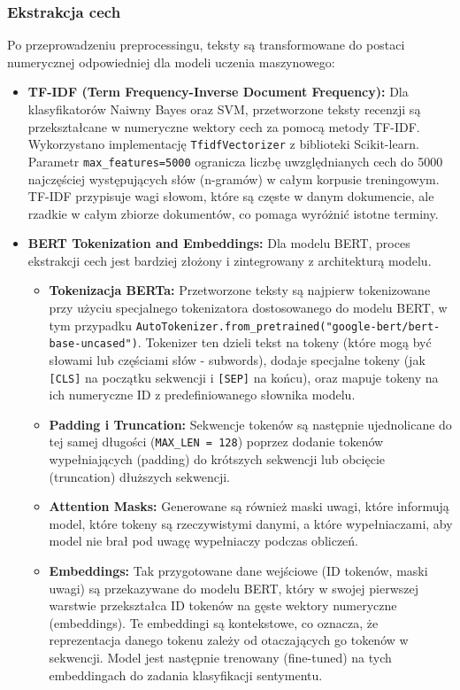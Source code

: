 \documentclass[runningheads]{llncs}
\begin{document}
\subsubsection{Ekstrakcja cech}
Po przeprowadzeniu preprocessingu, teksty są transformowane do postaci numerycznej odpowiedniej dla modeli uczenia maszynowego:
\begin{itemize}
    \item \textbf{TF-IDF (Term Frequency-Inverse Document Frequency):} Dla klasyfikatorów Naiwny Bayes oraz SVM, przetworzone teksty recenzji są przekształcane w numeryczne wektory cech za pomocą metody TF-IDF. Wykorzystano implementację \texttt{TfidfVectorizer} z biblioteki Scikit-learn. Parametr \texttt{max\_features=5000} ogranicza liczbę uwzględnianych cech do 5000 najczęściej występujących słów (n-gramów) w całym korpusie treningowym. TF-IDF przypisuje wagi słowom, które są częste w danym dokumencie, ale rzadkie w całym zbiorze dokumentów, co pomaga wyróżnić istotne terminy.
    \item \textbf{BERT Tokenization and Embeddings:} Dla modelu BERT, proces ekstrakcji cech jest bardziej złożony i zintegrowany z architekturą modelu.
    \begin{itemize}
        \item \textbf{Tokenizacja BERTa:} Przetworzone teksty są najpierw tokenizowane przy użyciu specjalnego tokenizatora dostosowanego do modelu BERT, w tym przypadku \texttt{AutoTokenizer.from\_pretrained("google-bert/bert-base-uncased")}. Tokenizer ten dzieli tekst na tokeny (które mogą być słowami lub częściami słów - subwords), dodaje specjalne tokeny (jak \texttt{[CLS]} na początku sekwencji i \texttt{[SEP]} na końcu), oraz mapuje tokeny na ich numeryczne ID z predefiniowanego słownika modelu.
        \item \textbf{Padding i Truncation:} Sekwencje tokenów są następnie ujednolicane do tej samej długości (\texttt{MAX\_LEN = 128}) poprzez dodanie tokenów wypełniających (padding) do krótszych sekwencji lub obcięcie (truncation) dłuższych sekwencji.
        \item \textbf{Attention Masks:} Generowane są również maski uwagi, które informują model, które tokeny są rzeczywistymi danymi, a które wypełniaczami, aby model nie brał pod uwagę wypełniaczy podczas obliczeń.
        \item \textbf{Embeddings:} Tak przygotowane dane wejściowe (ID tokenów, maski uwagi) są przekazywane do modelu BERT, który w swojej pierwszej warstwie przekształca ID tokenów na gęste wektory numeryczne (embeddings). Te embeddingi są kontekstowe, co oznacza, że reprezentacja danego tokenu zależy od otaczających go tokenów w sekwencji. Model jest następnie trenowany (fine-tuned) na tych embeddingach do zadania klasyfikacji sentymentu.
    \end{itemize}
\end{itemize}
\end{document}
